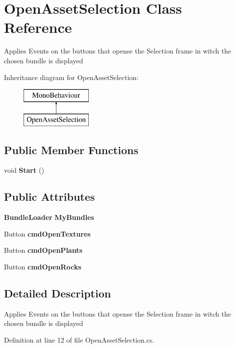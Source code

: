\section{Open\+Asset\+Selection Class Reference}
\label{class_open_asset_selection}


Applies Events on the buttons that opense the Selection frame in witch the chosen bundle is displayed  


Inheritance diagram for Open\+Asset\+Selection\+:\begin{figure}[H]
\begin{center}
\leavevmode
\includegraphics[height=2.000000cm]{class_open_asset_selection}
\end{center}
\end{figure}
\subsection*{Public Member Functions}
\begin{DoxyCompactItemize}
\item 
void \textbf{ Start} ()
\end{DoxyCompactItemize}
\subsection*{Public Attributes}
\begin{DoxyCompactItemize}
\item 
\textbf{ Bundle\+Loader} \textbf{ My\+Bundles}
\item 
Button \textbf{ cmd\+Open\+Textures}
\item 
Button \textbf{ cmd\+Open\+Plants}
\item 
Button \textbf{ cmd\+Open\+Rocks}
\end{DoxyCompactItemize}


\subsection{Detailed Description}
Applies Events on the buttons that opense the Selection frame in witch the chosen bundle is displayed 



Definition at line 12 of file Open\+Asset\+Selection.\+cs.



